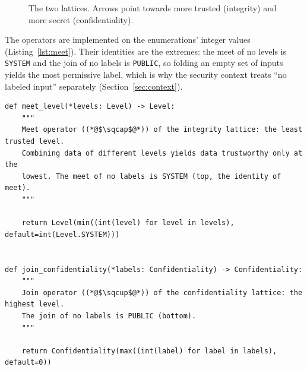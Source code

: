 \documentclass[11pt,a4paper]{article}
\DeclareRobustCommand{\code}[1]{{\renewcommand{\_}{\textunderscore\allowbreak}\texttt{#1}}}
\begin{document}
\begin{figure}[h]
\centering
{}
\caption{The two lattices. Arrows point towards more trusted (integrity) and more secret
(confidentiality).}
\label{fig:lattices}
\end{figure}

The operators are implemented on the enumerations' integer values
(Listing~\ref{lst:meet}). Their identities are the extremes: the meet of no levels is
\code{SYSTEM} and the join of no labels is \code{PUBLIC}, so folding an empty set of
inputs yields the most permissive label, which is why the security context treats ``no
labeled input'' separately (Section~\ref{sec:context}).

\begin{lstlisting}[firstnumber=64,style=py,caption={Meet and join operators (\texttt{state.py}, lines 64--80)},label={lst:meet}]
def meet_level(*levels: Level) -> Level:
    """
    Meet operator ((*@$\sqcap$@*)) of the integrity lattice: the least trusted level.
    Combining data of different levels yields data trustworthy only at the
    lowest. The meet of no labels is SYSTEM (top, the identity of meet).
    """

    return Level(min((int(level) for level in levels), default=int(Level.SYSTEM)))


def join_confidentiality(*labels: Confidentiality) -> Confidentiality:
    """
    Join operator ((*@$\sqcup$@*)) of the confidentiality lattice: the highest level.
    The join of no labels is PUBLIC (bottom).
    """

    return Confidentiality(max((int(label) for label in labels), default=0))
\end{lstlisting}
\end{document}

